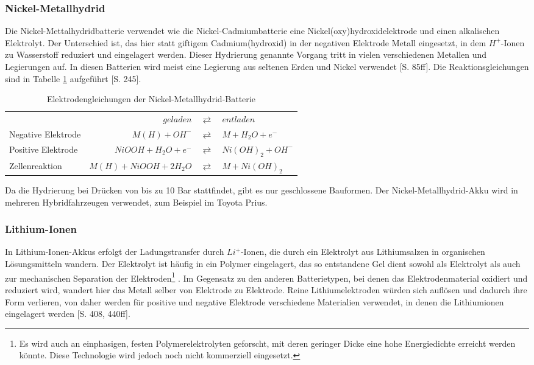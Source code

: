 \subsubsection{Nickel-Metallhydrid}
Die Nickel-Mettalhydridbatterie verwendet wie die Nickel-Cadmiumbatterie eine Nickel(oxy)hydroxidelektrode und einen alkalischen Elektrolyt. Der Unterschied ist, das hier statt giftigem Cadmium(hydroxid) in der negativen Elektrode Metall eingesetzt, in dem $H^+$-Ionen zu Wasserstoff reduziert und eingelagert werden. Dieser Hydrierung genannte Vorgang tritt in vielen verschiedenen Metallen und Legierungen auf. In diesen Batterien wird meist eine Legierung aus seltenen Erden und Nickel verwendet \cite{KiehneBattery}[S. 85ff]. Die Reaktionsgleichungen sind in Tabelle \ref{NiMH} aufgeführt \cite{Sterner:2014}[S. 245].\\
\begin{table}\centering
  \begin{tabularx}{\linewidth}{XrcX}
  	                   &              $geladen$ & $\rightleftarrows$ & $entladen$        \\
  	Negative Elektrode &          $M(H) + OH^-$ & $\rightleftarrows$ & $M + H_2O + e^-$  \\
  	Positive Elektrode &   $NiOOH + H_2O + e^-$ & $\rightleftarrows$ & $Ni(OH)_2 + OH^-$ \\ \midrule
  	Zellenreaktion     & $M(H) + NiOOH + 2H_2O$ & $\rightleftarrows$ & $M + Ni(OH)_2$    \\
  \end{tabularx}
  \caption{Elektrodengleichungen der Nickel-Metallhydrid-Batterie}
  \label{NiMH}
\end{table}
Da die Hydrierung bei Drücken von bis zu 10 Bar stattfindet, gibt es nur geschlossene Bauformen. Der Nickel-Metallhydrid-Akku wird in mehreren Hybridfahrzeugen verwendet, zum Beispiel im Toyota Prius.

\subsubsection{Lithium-Ionen}
In Lithium-Ionen-Akkus erfolgt der Ladungstransfer durch $Li^+$-Ionen, die durch ein Elektrolyt aus Lithiumsalzen in organischen Lösungsmitteln wandern. Der Elektrolyt ist häufig in ein Polymer eingelagert, das so entstandene Gel dient sowohl als Elektrolyt als auch zur mechanischen Separation der Elektroden\footnote{Es wird auch an einphasigen, festen Polymerelektrolyten geforscht, mit deren geringer Dicke eine hohe Energiedichte erreicht werden könnte. Diese Technologie wird jedoch noch nicht kommerziell eingesetzt.} \cite{xu2004nonaqueous}. Im Gegensatz zu den anderen Batterietypen, bei denen das Elektrodenmaterial oxidiert und reduziert wird, wandert hier das Metall selber von Elektrode zu Elektrode. Reine Lithiumelektroden würden sich auflösen und dadurch ihre Form verlieren, von daher werden für positive und negative Elektrode verschiedene Materialien verwendet, in denen die Lithiumionen eingelagert werden \cite{KiehneBattery}[S. 408, 440ff].
